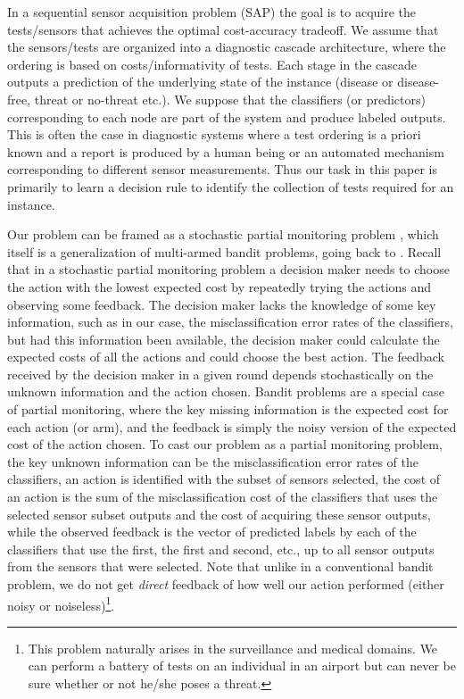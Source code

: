 In a sequential sensor acquisition problem (SAP) 
 the goal is to acquire the tests/sensors that achieves the optimal cost-accuracy tradeoff.
 We assume that the sensors/tests are organized into a diagnostic cascade architecture, where the ordering is based on costs/informativity of tests. Each stage in the cascade outputs a prediction of the underlying state of the instance (disease or disease-free, threat or no-threat etc.). We suppose that the classifiers (or predictors) corresponding to each node are part of the system and produce labeled outputs. This is often the case in diagnostic systems where a test ordering is a priori known and a report is produced by a human being or an automated mechanism corresponding to different sensor measurements. Thus our task in this paper is primarily to learn a decision rule to identify the collection of tests required for an instance. 
\fi

Our problem can be framed as a stochastic partial monitoring problem \citep{BaFoPaRaSze14},
which itself is a generalization of multi-armed bandit problems, going back to \citet{Tho33}. 
Recall that in a stochastic partial monitoring problem a decision maker needs to choose the action with the lowest 
expected cost by repeatedly trying the actions and observing some feedback.
The decision maker lacks the knowledge of some key information, such as in our case, the misclassification
error rates of the classifiers, but had this information been available, the decision maker could calculate the
expected costs of all the actions and could choose the best action. The feedback received by the decision
maker in a given round depends stochastically on the unknown information and the action chosen.
Bandit problems are a special case of partial monitoring, where the key missing information is the expected
cost for each action (or arm), and the feedback is simply the noisy version of the expected cost of the action chosen.
To cast our problem as a partial monitoring problem,  
the key unknown information can be the misclassification error rates of the classifiers, an action is identified with 
the subset of sensors selected, the cost of an action is the sum of the misclassification cost of the classifiers
that uses the selected sensor subset outputs and the cost of acquiring these sensor outputs,
while the observed feedback is the vector of predicted labels by each of the classifiers that use 
the first, the first and second, etc., up to all sensor outputs from the sensors that were selected.
Note that unlike in a conventional bandit problem, we do not get \emph{direct} 
feedback of how well our action performed (either noisy or noiseless)\footnote{This problem naturally arises in the surveillance and medical domains. We can perform a battery of tests on an individual in an airport but can never be sure whether or not he/she poses a threat.}.

